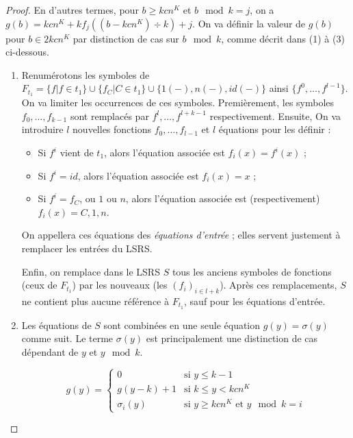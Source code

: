 \documentclass{article}
\begin{document}
\begin{proof}
{\begin{minipage}{0.9\textwidth}
				\end{minipage}
			}
				
				\espace
			
			
			En d'autres termes, pour $b \geqslant kcn^K$ et $b \mod{k} = j$, on a $g(b) = kcn^K + k f_j\left( (b-kcn^K) \div k \right) + j$.
			On va définir la valeur de $g(b)$ pour $b \in 2kcn^K$ par distinction de cas sur $b \mod{k}$, comme décrit dans (1) à (3) ci-dessous.
			
			\begin{enumerate}[itemsep=-1mm,leftmargin=2cm]
				\item  
					Renumérotons les symboles de $F_{t_1} = \{f | f \in t_1\} \cup \{f_C | C \in t_1\} \cup \{1(-), n(-), id(-)\}$ ainsi $\{ f^0, \dots, f^{l-1} \}$. On va limiter les occurrences de ces symboles. Premièrement, les symboles $f_0, \dots, f_{k-1}$ sont remplacés par $f^{l}, \dots, f^{l+k-1}$ respectivement. Ensuite, On va introduire $l$ nouvelles fonctions $f_0, \dots, f_{l-1}$ et $l$ équations pour les définir :
					
						\begin{itemize}[itemsep=-1mm,leftmargin=1cm]
							\item	Si $f^i$ vient de $t_1$, alors l'équation associée est $f_i(x) = f^i(x)$ ;
							\item 	Si $f^i = id$, alors l'équation associée est $f_i(x) = x$ ;
							\item 	Si $f^i = f_C$, ou $1$ ou $n$, alors l'équation associée est (respectivement) $f_i(x) = C, 1, n$. 
						\end{itemize}
				
					
					On appellera ces équations des \emph{équations d'entrée} ; elles servent justement à remplacer les entrées du LSRS.
					
					Enfin, on remplace dans le LSRS $S$ tous les anciens symboles de fonctions (ceux de $F_{t_1}$) par les nouveaux (les $(f_i)_{i \in l+k}$). Après ces remplacements, $S$ ne contient plus aucune référence à $F_{t_1}$, sauf pour les équations d'entrée. 
					
				\item 	
					Les équations de $S$ sont combinées en une seule équation $g(y) = \sigma(y)$ comme suit. Le terme $\sigma(y)$ est principalement une distinction de cas dépendant de $y$ et $y \mod{k}$. 
				
					\[
						g(y) = 
							\left\lbrace \begin{array}{ll}
								0 				& \text{si $y \leqslant k-1$} \\
								g(y-k) + 1 		& \text{si $k \leqslant y < kcn^K$} \\
								\sigma_i(y)		& \text{si $y \geqslant kcn^K$ et $y \mod{k} = i$}
							\end{array}\right.
					\]
					

\end{enumerate}
\end{proof}
\end{document}
